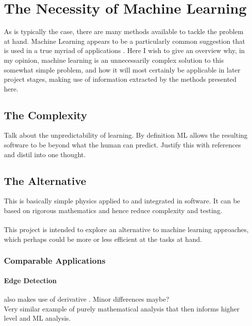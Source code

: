 \documentclass[main.tex]{subfiles}
\begin{document}
      
  \section{The Necessity of Machine Learning}
  
    As is typically the case, there are many methods available to tackle the problem at hand. Machine Learning appears to be a particularly common suggestion that is used in a true myriad of applications \cite{}. Here I wish to give an overview why, in my opinion, machine learning is an unnecessarily complex solution to this somewhat simple problem, and how it will most certainly be applicable in later project stages, making use of information extracted by the methods presented here.
    
    \subsection{The Complexity}
    
      Talk about the unpredictability of learning. By definition ML allows the resulting software to be beyond what the human can predict. Justify this with references and distil into one thought.
    
    \subsection{The Alternative}
    
      This is basically simple physics applied to and integrated in software. It can be based on rigorous mathematics and hence reduce complexity and testing.
      \\\\
      This project is intended to explore an alternative to machine learning approaches, which perhaps could be more or less efficient at the tasks at hand. 
    
    \subsubsection*{Comparable Applications}
    
      \paragraph{Edge Detection} %
      also makes use of derivative \cite{}. Minor differences maybe? \\
      Very similar example of purely mathematical analysis that then informs higher level and ML analysis.
    
\end{document}
